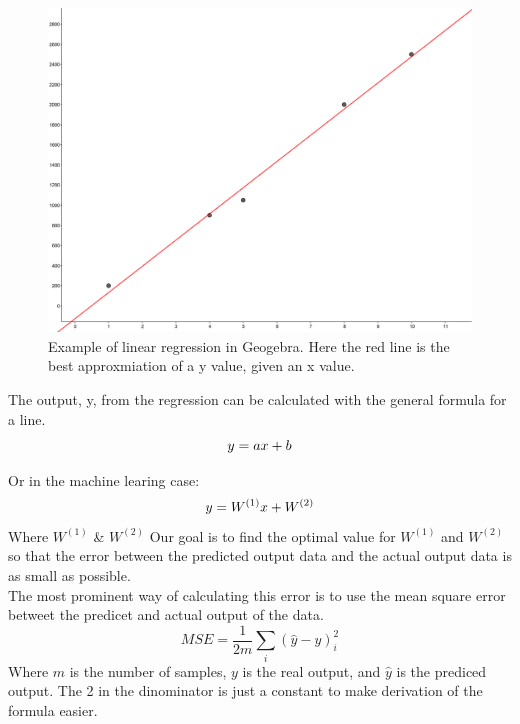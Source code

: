 	\begin{figure}
	    \centering
	    \includegraphics[scale=0.05]{background/figures/linear_regression.png}
	    \caption{Example of linear regression in Geogebra. Here the red line is the best approxmiation of a y value, given an x value.} 
	\end{figure} %
 
	The output, y, from the regression can be calculated with the general formula for a line.
	\begin{equation}
	  y=ax+b\\
	\end{equation}
	
	Or in the machine learing case:\\
	\begin{equation}
	  y=W^{(1)}x+W^{(2)}\\
	\end{equation}
	Where $W^{(1)}$ \& $W^{(2)}$
	Our goal is to find the optimal value for $W^{(1)}$ and $W^{(2)}$ so that the error between the predicted output data and the 
	actual output data is as small as possible.\\
	
	The most prominent way of calculating this error is to use the mean square error betweet the predicet and actual output of the data. 
	\begin{equation}\label{MSE_form}
	 MSE=\frac{1}{2m} \sum_i (\hat{y}-y)_i^2
	\end{equation}
	Where $m$ is the number of samples, $y$ is the real output, and $\hat{y}$ is the prediced output. The 2 in the dinominator is just a constant
	to make derivation of the formula easier.\\
	
